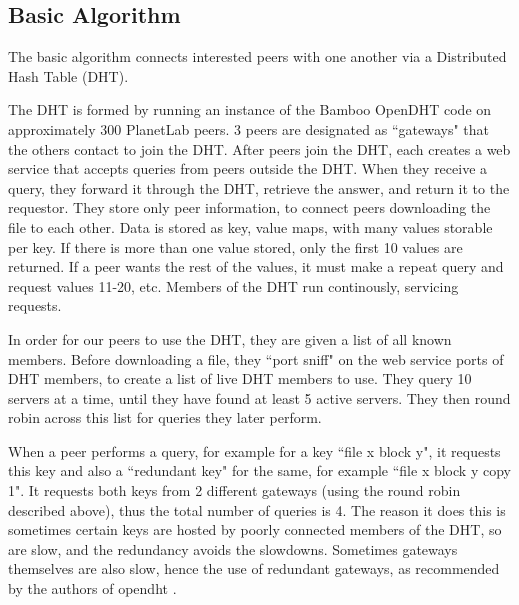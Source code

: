 \subsection{Basic Algorithm}

The basic algorithm connects interested peers with one another via a Distributed Hash Table (DHT).

The DHT is formed by running an instance of the Bamboo OpenDHT code on approximately 300 PlanetLab peers.  3 peers are designated as ``gateways" that the others
contact to join the DHT.  After peers join the DHT, each creates a web service that accepts queries from peers outside the DHT.  When they receive a
query, they forward it through the DHT, retrieve the answer, and return it to the requestor. They store only peer information, to connect peers downloading the file to each other.
Data is stored as key, value maps, with many values storable per key.  If there is more than one value stored, only the first 10 values are returned. 
If a peer wants the rest of the values, it must make a repeat query and request values 11-20, etc.  Members of the DHT run continously, servicing requests.

In order for our peers to use the DHT, they are given a list of all known members.  Before downloading a file, they ``port sniff" on the web service ports of
DHT members, to create a list of live DHT members to use.  They query 10 servers at a time, until they have found at least 5 active servers.
They then round robin across this list for queries they later perform.

When a peer performs a query, for example for a key ``file x block y", it requests this key and also a ``redundant key" for the same, 
for example ``file x block y copy 1".  It requests both keys from 2 different gateways (using the round robin described above), 
thus the total number of queries is 4.  
The reason it does this is sometimes certain keys are hosted by poorly connected members of the DHT, so are slow, and the redundancy avoids the slowdowns.
Sometimes gateways themselves are also slow, hence the use of redundant gateways, as recommended by the authors of opendht \cite{opendht_speed}.

